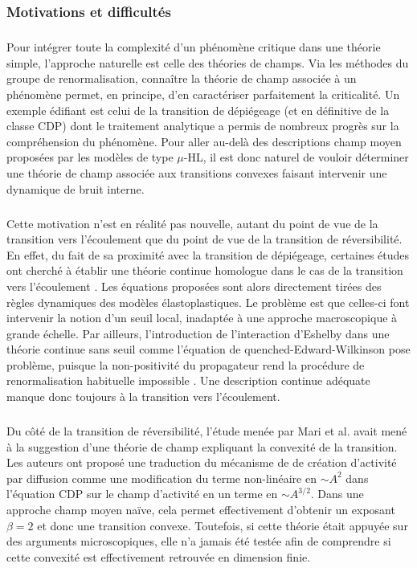 
\label{sec:eqChampConv}

\subsubsection{Motivations et difficultés}

\subparagraph{}Pour intégrer toute la complexité d'un phénomène critique dans une théorie simple, l'approche naturelle est celle des théories de champs. Via les méthodes du groupe de renormalisation, connaître la théorie de champ associée à un phénomène permet, en principe, d'en caractériser parfaitement la criticalité. Un exemple édifiant est celui de la transition de dépiégeage (et en définitive de la classe CDP) dont le traitement analytique a permis de nombreux progrès sur la compréhension du phénomène. Pour aller au-delà des descriptions champ moyen proposées par les modèles de type $\mu$-HL, il est donc naturel de vouloir déterminer une théorie de champ associée aux transitions convexes faisant intervenir une dynamique de bruit interne.

\subparagraph{}Cette motivation n'est en réalité pas nouvelle, autant du point de vue de la transition vers l'écoulement que du point de vue de la transition de réversibilité. En effet, du fait de sa proximité avec la transition de dépiégeage, certaines études ont cherché à établir une théorie continue homologue dans le cas de la transition vers l'écoulement \cite{tyukodi_depinning_2016, weiss_finite_2014}. Les équations proposées sont alors directement tirées des règles dynamiques des modèles élastoplastiques. Le problème est que celles-ci font intervenir la notion d'un seuil local, inadaptée à une approche macroscopique à grande échelle. Par ailleurs, l'introduction de l'interaction d'Eshelby dans une théorie continue sans seuil comme l'équation de quenched-Edward-Wilkinson pose problème, puisque la non-positivité du propagateur rend la procédure de renormalisation habituelle impossible \cite{wiese_blabla}. Une description continue adéquate manque donc toujours à la transition vers l'écoulement.

\subparagraph{}Du côté de la transition de réversibilité, l'étude menée par Mari et al. \cite{mari_absorbing_2022} avait mené à la suggestion d'une théorie de champ expliquant la convexité de la transition. Les auteurs ont proposé une traduction du mécanisme de de création d'activité par diffusion comme une modification du terme non-linéaire en $\sim A^2$ dans l'équation CDP sur le champ d'activité en un terme en $\sim A^{3/2}$. Dans une approche champ moyen naïve, cela permet effectivement d'obtenir un exposant $\beta = 2$ et donc une transition convexe. Toutefois, si cette théorie était appuyée sur des arguments microscopiques, elle n'a jamais été testée afin de comprendre si cette convexité est effectivement retrouvée en dimension finie.

